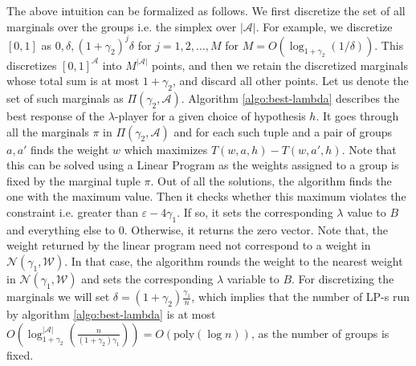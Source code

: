 \documentclass{article}
\newcommand{\set}[1]{\{#1\}}
\newcommand{\bbR}{\mathbb{R}}
\newcommand{\WW}{\mathcal{W}}
\newcommand{\abs}[1]{\left|#1\right|}
\newcommand{\Ac}{\mathcal{A}}
\newcommand{\Nc}{\mathcal{N}}
\newcommand{\eps}{\varepsilon}
\begin{document}
The above intuition can be formalized as follows.
%
We first discretize the set of all marginals over the groups i.e. the simplex over $\abs{\Ac}$.
For example, we discretize $[0,1]$ as $0,\delta, (1+\gamma_2)^j \delta$ for $j=1,2,\ldots,M$ for $M = O(\log_{1+\gamma_2}(1/\delta))$. This discretizes $[0,1]^{\Ac}$ into $M^{\abs{\Ac} }$ points, and then we retain the discretized marginals whose total sum is at most $1+\gamma_2$, and discard all other points. Let us denote the set of such marginals as $\Pi(\gamma_2,\Ac)$. Algorithm \ref{algo:best-lambda} describes the best response of the $\lambda$-player for a given choice of hypothesis $h$. It goes through all the marginals $\pi$ in $\Pi(\gamma_2,\Ac)$ and for each such tuple and a pair of groups $a,a'$ finds the weight $w$ which maximizes $T(w,a,h) - T(w,a',h)$. Note that this can be solved using a Linear Program as the weights assigned to a group is fixed by the marginal tuple $\pi$. Out of all the solutions, the algorithm finds the one with the maximum value. Then it checks whether this maximum violates the constraint i.e. greater than $\eps - 4\gamma_1$. If so, it sets the corresponding $\lambda$ value to $B$ and everything else to $0$. Otherwise, it returns the zero vector. Note that, the weight returned by the linear program need not correspond to a weight in $\Nc(\gamma_1, \WW)$. In that case, the algorithm rounds the weight to the nearest weight in $\Nc(\gamma_1,\WW)$ and sets the corresponding $\lambda$ variable to $B$. For discretizing the marginals we will set $\delta = (1+\gamma_2)\frac{\gamma_1}{n}$, which implies that the number of LP-s run by algorithm \ref{algo:best-lambda} is at most $O\left(\log^{\abs{\Ac}}_{1+\gamma_2}\left( \frac{n}{(1+\gamma_2)\gamma_1}\right)\right) = O(\textrm{poly}(\log n))$, as the number of groups is fixed.
\end{document}
